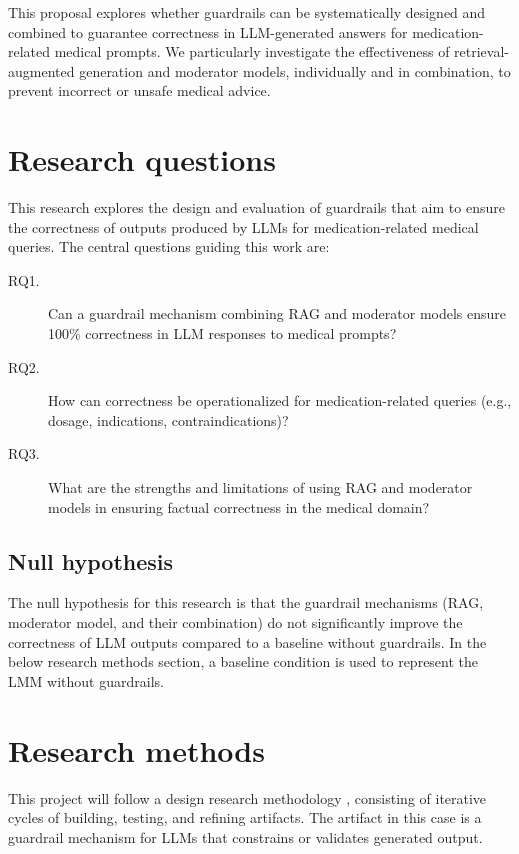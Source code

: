 \documentclass[a4paper,doc,natbib]{apa6}
\begin{document}
    This proposal explores whether guardrails can be systematically designed and combined to guarantee correctness in LLM-generated answers for medication-related medical prompts.
    We particularly investigate the effectiveness of retrieval-augmented generation and moderator models, individually and in combination, to prevent incorrect or unsafe medical advice.

    \section{Research questions}

    This research explores the design and evaluation of guardrails that aim to ensure the correctness of outputs produced by LLMs for medication-related medical queries.
    The central questions guiding this work are:

    \begin{description}
        \item[RQ1.] Can a guardrail mechanism combining RAG and moderator models ensure 100\% correctness in LLM responses to medical prompts?
        \item[RQ2.] How can correctness be operationalized for medication-related queries (e.g., dosage, indications, contraindications)?
        \item[RQ3.] What are the strengths and limitations of using RAG and moderator models in ensuring factual correctness in the medical domain?
    \end{description}

    \subsection{Null hypothesis}
    The null hypothesis for this research is that the guardrail mechanisms (RAG, moderator model, and their combination)
    do not significantly improve the correctness of LLM outputs compared to a baseline without guardrails.
    In the below research methods section, a baseline condition is used to represent the LMM without guardrails.

    \section{Research methods}

    This project will follow a design research methodology \citep{wieringa2014design}, consisting of iterative cycles of building, testing, and refining artifacts.
    The artifact in this case is a guardrail mechanism for LLMs that constrains or validates generated output.
\end{document}
